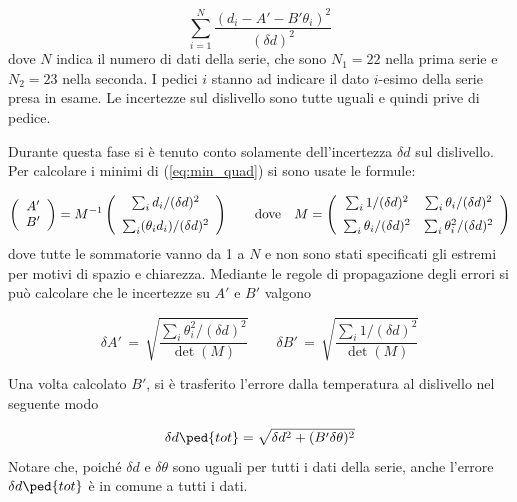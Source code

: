 \begin{equation}
    \sum_{i=1}^{N} \frac{(d_i - A' - B'\theta_i)^2}{(\delta d)^2}
    \label{eq:min_quad}
\end{equation}
%
dove $N$ indica il numero di dati della serie, che sono $N_1 = 22$ nella prima serie e $N_2 = 23$ nella seconda.
I pedici $i$ stanno ad indicare il dato $i$-esimo della serie presa in esame. Le incertezze sul dislivello sono tutte uguali e
quindi prive di pedice.

Durante questa fase si è tenuto conto solamente dell'incertezza $\delta d$ sul dislivello. Per calcolare i minimi
di (\ref{eq:min_quad}) si sono usate le formule:

\begin{equation}
    \left(
    \begin{array}{c}
        A' \\
        B'
    \end{array}
    \right)
    =
    M^{-1}
    \left(
    \begin{array}{c}
        \sum_i d_i/(\delta d)^2 \\[2mm]
        \sum_i (\theta_i d_i)/(\delta d)^2
    \end{array}
    \right)
    \qquad
    \text{dove}
    \quad
    M =
    \left(
    \begin{array}{c c}
        \sum_i 1/(\delta d)^2 & \sum_i \theta_i/(\delta d)^2 \\[2mm]
        \sum_i \theta_i/(\delta d)^2 & \sum_i \theta_i^2/(\delta d)^2
    \end{array}
    \right)
    \label{eq:A_e_B}
\end{equation}
%
dove tutte le sommatorie vanno da 1 a $N$ e non sono stati specificati gli estremi per motivi di spazio e chiarezza. Mediante le regole
di propagazione degli errori si può calcolare che le incertezze su $A'$ e $B'$ valgono

\begin{equation}
    \delta A' \,=\, \sqrt{\frac{\sum_i \theta_i^2/(\delta d)^2}{\det(M)}}
    \qquad
    \delta B' \,=\, \sqrt{\frac{\sum_i 1/(\delta d)^2}{\det(M)}}
    \label{eq:dA_e_dB}
\end{equation}

Una volta calcolato $B'$, si è trasferito l'errore dalla temperatura al dislivello nel seguente modo

\begin{equation}
    \delta d\ped{tot} = \sqrt{\delta d^2 + (B'\delta \theta)^2}
    \label{eq:err_tras_1}
\end{equation}
%
Notare che, poiché $\delta d$ e $\delta \theta$ sono uguali per tutti i dati della serie,
anche l'errore $\delta d\ped{tot}$ è in comune a tutti i dati.

